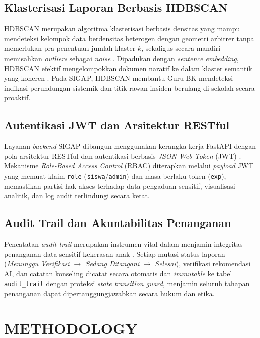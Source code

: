\documentclass[conference]{IEEEtran}
\begin{document}
\subsection{Klasterisasi Laporan Berbasis HDBSCAN}
HDBSCAN merupakan algoritma klasterisasi berbasis densitas yang mampu mendeteksi kelompok data berdensitas heterogen dengan geometri arbitrer tanpa memerlukan pra-penentuan jumlah klaster $k$, sekaligus secara mandiri memisahkan \textit{outliers} sebagai \textit{noise} \cite{malzer2020}. Dipadukan dengan \textit{sentence embedding}, HDBSCAN efektif mengelompokkan dokumen naratif ke dalam klaster semantik yang koheren \cite{grootendorst2022}. Pada SIGAP, HDBSCAN membantu Guru BK mendeteksi indikasi perundungan sistemik dan titik rawan insiden berulang di sekolah secara proaktif.

\subsection{Autentikasi JWT dan Arsitektur RESTful}
Layanan \textit{backend} SIGAP dibangun menggunakan kerangka kerja FastAPI dengan pola arsitektur RESTful dan autentikasi berbasis \textit{JSON Web Token} (JWT) \cite{chakravarthy2019}. Mekanisme \textit{Role-Based Access Control} (RBAC) diterapkan melalui \textit{payload} JWT yang memuat klaim \texttt{role} (\texttt{siswa}/\texttt{admin}) dan masa berlaku token (\texttt{exp}), memastikan partisi hak akses terhadap data pengaduan sensitif, visualisasi analitik, dan log audit terlindungi secara ketat.

\subsection{Audit Trail dan Akuntabilitas Penanganan}
Pencatatan \textit{audit trail} merupakan instrumen vital dalam menjamin integritas penanganan data sensitif kekerasan anak \cite{regueiro2021}. Setiap mutasi status laporan (\textit{Menunggu Verifikasi} $\rightarrow$ \textit{Sedang Ditangani} $\rightarrow$ \textit{Selesai}), verifikasi rekomendasi AI, dan catatan konseling dicatat secara otomatis dan \textit{immutable} ke tabel \texttt{audit\_trail} dengan proteksi \textit{state transition guard}, menjamin seluruh tahapan penanganan dapat dipertanggungjawabkan secara hukum dan etika.

\section{METHODOLOGY}
\end{document}
